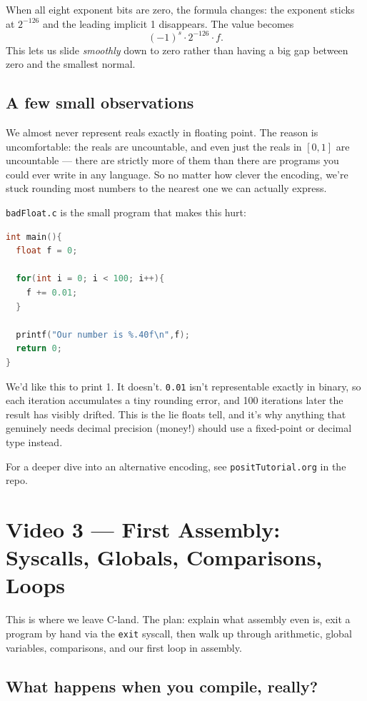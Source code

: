\documentclass[11pt]{article}
\begin{document}
When all eight exponent bits are zero, the formula changes: the
exponent sticks at $2^{-126}$ and the leading implicit 1 disappears.
The value becomes
\[
  (-1)^s \cdot 2^{-126} \cdot f.
\]
This lets us slide \emph{smoothly} down to zero rather than having a
big gap between zero and the smallest normal.

\subsection*{A few small observations}

We almost never represent reals exactly in floating point. The reason
is uncomfortable: the reals are uncountable, and even just the reals
in $[0, 1]$ are uncountable --- there are strictly more of them than
there are programs you could ever write in any language. So no matter
how clever the encoding, we're stuck rounding most numbers to the
nearest one we can actually express.

\texttt{badFloat.c} is the small program that makes this hurt:

\begin{lstlisting}[language=C]
int main(){
  float f = 0;

  for(int i = 0; i < 100; i++){
    f += 0.01;
  }

  printf("Our number is %.40f\n",f);
  return 0;
}
\end{lstlisting}

We'd like this to print 1. It doesn't. \texttt{0.01} isn't
representable exactly in binary, so each iteration accumulates a tiny
rounding error, and 100 iterations later the result has visibly
drifted. This is the lie floats tell, and it's why anything that
genuinely needs decimal precision (money!) should use a fixed-point or
decimal type instead.

For a deeper dive into an alternative encoding, see
\texttt{positTutorial.org} in the repo.

\section{Video 3 --- First Assembly: Syscalls, Globals, Comparisons, Loops}

This is where we leave C-land. The plan: explain what assembly even
is, exit a program by hand via the \texttt{exit} syscall, then walk up
through arithmetic, global variables, comparisons, and our first loop
in assembly.

\subsection*{What happens when you compile, really?}
\end{document}
